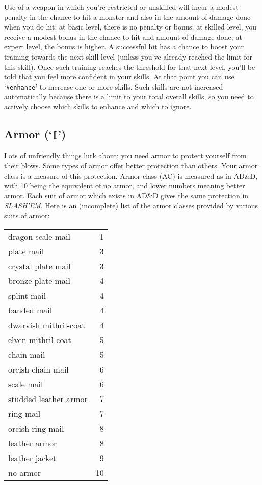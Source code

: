 Use of a weapon in which you're restricted or unskilled
will incur a modest penalty in the chance to hit a monster and also in
the amount of damage done when you do hit; at basic level, there is no
penalty or bonus; at skilled level, you receive a modest bonus in the
chance to hit and amount of damage done; at expert level, the bonus is
higher.  A successful hit has a chance to boost your training towards
the next skill level (unless you've already reached the limit for this
skill).  Once such training reaches the threshold for that next level,
you'll be told that you feel more confident in your skills.  At that
point you can use `{\tt \#enhance}' to increase one or more skills.  Such skills
are not increased automatically because there is a limit to your total
overall skills, so you need to actively choose which skills to enhance
and which to ignore.
\subsection*{Armor (`{\tt [}')}


Lots of unfriendly things lurk about; you need armor to protect
yourself from their blows.  Some types of armor offer better
protection than others.  Your armor class is a measure of this
protection.  Armor class (AC) is measured as in AD\&D, with 10 being
the equivalent of no armor, and lower numbers meaning better armor.
Each suit of armor which exists in AD\&D gives the same protection in
{\it SLASH'EM}.  Here is an (incomplete) list of the armor classes provided by
various suits of armor:

\begin{center}
\begin{tabular}{lr}
dragon scale mail     &  1\\
plate mail            &  3\\
crystal plate mail    &  3\\
bronze plate mail     &  4\\
splint mail           &  4\\
banded mail           &  4\\
dwarvish mithril-coat &  4\\
elven mithril-coat    &  5\\
chain mail            &  5\\
orcish chain mail     &  6\\
scale mail            &  6\\
studded leather armor &  7\\
ring mail             &  7\\
orcish ring mail      &  8\\
leather armor         &  8\\
leather jacket        &  9\\
no armor              & 10
\end{tabular}
\end{center}

